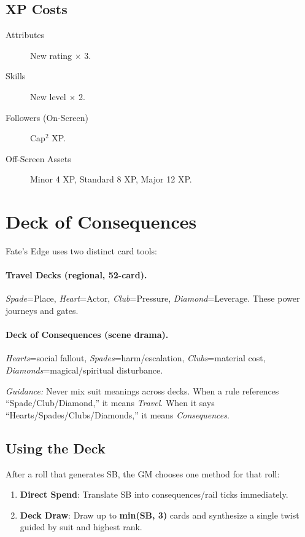 \subsection{XP Costs}

\begin{description}
\item[Attributes] New rating $\times$ 3.
\item[Skills] New level $\times$ 2.
\item[Followers (On-Screen)] Cap$^2$ XP.
\item[Off-Screen Assets] Minor 4 XP, Standard 8 XP, Major 12 XP.
\end{description}

\section{Deck of Consequences}

Fate's Edge uses two distinct card tools:

\paragraph{Travel Decks (regional, 52-card).}
\emph{Spade}=Place, \emph{Heart}=Actor, \emph{Club}=Pressure, \emph{Diamond}=Leverage. These power journeys and gates.

\paragraph{Deck of Consequences (scene drama).}
\emph{Hearts}=social fallout, \emph{Spades}=harm/escalation, \emph{Clubs}=material cost, \emph{Diamonds}=magical/spiritual disturbance.

\textit{Guidance:} Never mix suit meanings across decks. When a rule references ``Spade/Club/Diamond,'' it means \emph{Travel}. When it says ``Hearts/Spades/Clubs/Diamonds,'' it means \emph{Consequences}.

\subsection{Using the Deck}

After a roll that generates SB, the GM chooses one method for that roll:
\begin{enumerate}
  \item \textbf{Direct Spend}: Translate SB into consequences/rail ticks immediately.
  \item \textbf{Deck Draw}: Draw up to \textbf{min(SB, 3)} cards and synthesize a single twist guided by suit and highest rank.
\end{enumerate}

